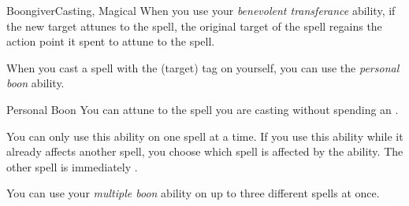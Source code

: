\begin{feat}{Boongiver}{Casting, Magical}
         When you use your \textit{benevolent transferance} ability, if the new target attunes to the spell, the original target of the spell regains the action point it spent to attune to the spell.

         When you cast a spell with the  (target) tag on yourself, you can use the \textit{personal boon} ability.
        \begin{freeability}{Personal Boon}
            You can attune to the spell you are casting without spending an .

            You can only use this ability on one spell at a time.
            If you use this ability while it already affects another spell, you choose which spell is affected by the ability.
            The other spell is immediately .
        \end{freeability}

         You can use your \textit{multiple boon} ability on up to three different spells at once.
    \end{feat}

